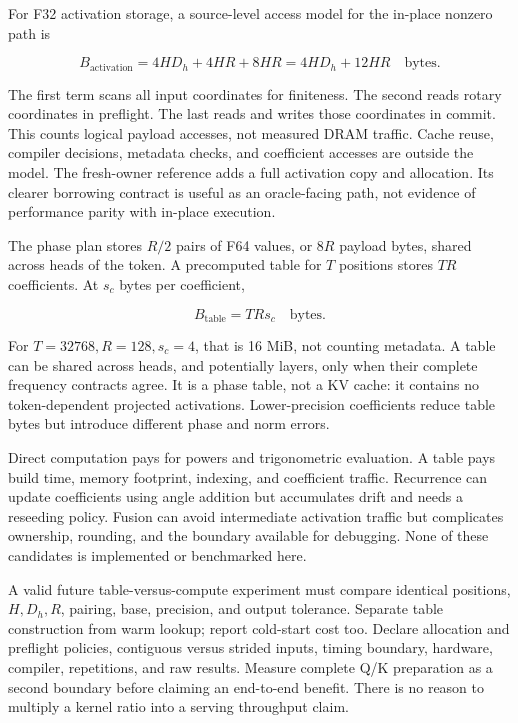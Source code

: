 For F32 activation storage, a source-level access model for the in-place
nonzero path is

\begin{equation}
B_{\mathrm{activation}}
=4HD_h+4HR+8HR
=4HD_h+12HR\quad\text{bytes}.
\end{equation}

The first term scans all input coordinates for finiteness. The second
reads rotary coordinates in preflight. The last reads and writes those
coordinates in commit. This counts logical payload accesses, not
measured DRAM traffic. Cache reuse, compiler decisions, metadata checks,
and coefficient accesses are outside the model. The fresh-owner
reference adds a full activation copy and allocation. Its clearer
borrowing contract is useful as an oracle-facing path, not evidence of
performance parity with in-place execution.

The phase plan stores \(R/2\) pairs of F64 values, or \(8R\) payload
bytes, shared across heads of the token. A precomputed table for \(T\)
positions stores \(TR\) coefficients. At \(s_c\) bytes per coefficient,

\begin{equation}
B_{\mathrm{table}}=TRs_c\quad\text{bytes}.
\end{equation}

For \(T=32768,R=128,s_c=4\), that is 16 MiB, not counting metadata. A
table can be shared across heads, and potentially layers, only when
their complete frequency contracts agree. It is a phase table, not a KV
cache: it contains no token-dependent projected activations.
Lower-precision coefficients reduce table bytes but introduce different
phase and norm errors.

Direct computation pays for powers and trigonometric evaluation. A table
pays build time, memory footprint, indexing, and coefficient traffic.
Recurrence can update coefficients using angle addition but accumulates
drift and needs a reseeding policy. Fusion can avoid intermediate
activation traffic but complicates ownership, rounding, and the boundary
available for debugging. None of these candidates is implemented or
benchmarked here.

A valid future table-versus-compute experiment must compare identical
positions, \(H,D_h,R\), pairing, base, precision, and output tolerance.
Separate table construction from warm lookup; report cold-start cost
too. Declare allocation and preflight policies, contiguous versus
strided inputs, timing boundary, hardware, compiler, repetitions, and
raw results. Measure complete Q/K preparation as a second boundary
before claiming an end-to-end benefit. There is no reason to multiply a
kernel ratio into a serving throughput claim.

